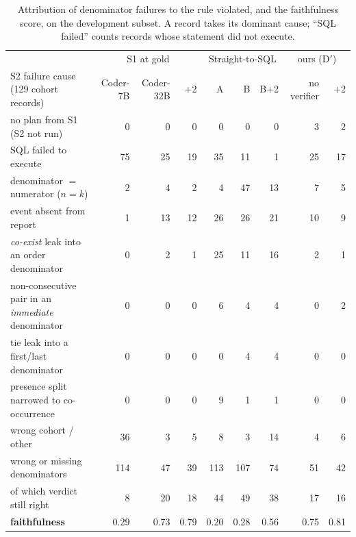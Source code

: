\begin{table}[t]
\centering
\footnotesize
\setlength{\tabcolsep}{4pt}
\begin{tabular}{lrrrrrrrr}
\toprule
 & \multicolumn{3}{c}{S1 at gold} & \multicolumn{3}{c}{Straight-to-SQL} & \multicolumn{2}{c}{ours (D$'$)} \\
S2 failure cause (129 cohort records) & Coder-7B & Coder-32B & \quad+2 & A & B & B+2 & no verifier & +2 \\
\midrule
no plan from S1 (S2 not run) & 0 & 0 & 0 & 0 & 0 & 0 & 3 & 2 \\
SQL failed to execute & 75 & 25 & 19 & 35 & 11 & 1 & 25 & 17 \\
denominator $=$ numerator ($n=k$) & 2 & 4 & 2 & 4 & 47 & 13 & 7 & 5 \\
event absent from report & 1 & 13 & 12 & 26 & 26 & 21 & 10 & 9 \\
\emph{co-exist} leak into an order denominator & 0 & 2 & 1 & 25 & 11 & 16 & 2 & 1 \\
non-consecutive pair in an \emph{immediate} denominator & 0 & 0 & 0 & 6 & 4 & 4 & 0 & 2 \\
tie leak into a first/last denominator & 0 & 0 & 0 & 0 & 4 & 4 & 0 & 0 \\
presence split narrowed to co-occurrence & 0 & 0 & 0 & 9 & 1 & 1 & 0 & 0 \\
wrong cohort / other & 36 & 3 & 5 & 8 & 3 & 14 & 4 & 6 \\
\midrule
wrong or missing denominators & 114 & 47 & 39 & 113 & 107 & 74 & 51 & 42 \\
\quad of which verdict still right & 8 & 20 & 18 & 44 & 49 & 38 & 17 & 16 \\
\textbf{faithfulness} & 0.29 & 0.73 & 0.79 & 0.20 & 0.28 & 0.56 & 0.75 & 0.81 \\
\bottomrule
\end{tabular}
\caption{Attribution of denominator failures to the rule violated, and the
faithfulness score, on the development subset. A record takes its dominant
cause; ``SQL failed'' counts records whose statement did not execute.}
\label{tab:attribution}
\end{table}


